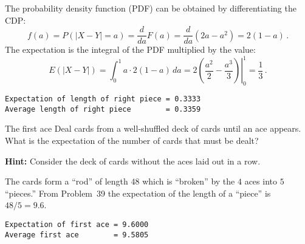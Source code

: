 The probability density function (PDF) can be obtained by differentiating the CDP:
\[
f(a)=P(|X-Y|=a)= \frac{d}{da}F(a) =
  \frac{d}{da}(2a-a^2)=2(1-a)\,.
\]
The expectation is the integral of the PDF multiplied by the value:
\[
E(|X-Y|)= \int_{0}^{1} a\cdot2(1-a)\, da=
  2\left.\left(\frac{a^2}{2}-\frac{a^3}{3}\right)\right|_0^1=\frac{1}{3}\,.
\]

\newpage

\sml{}
\begin{verbatim}
Expectation of length of right piece = 0.3333
Average length of right piece        = 0.3359
\end{verbatim}


\begin{prob}{The first ace}
Deal cards from a well-shuffled deck of cards until an ace appears. What is the expectation of the number of cards that must be dealt?

\textbf{Hint:} Consider the deck of cards without the aces laid out in a row.
\end{prob}

\solution{}

The cards form a ``rod'' of length $48$ which is ``broken'' by the $4$ aces into $5$ ``pieces.'' From Problem~39 the expectation of the length of a ``piece'' is $48/5=9.6$.

\sml{}
\begin{verbatim}
Expectation of first ace = 9.6000
Average first ace        = 9.5805
\end{verbatim}

